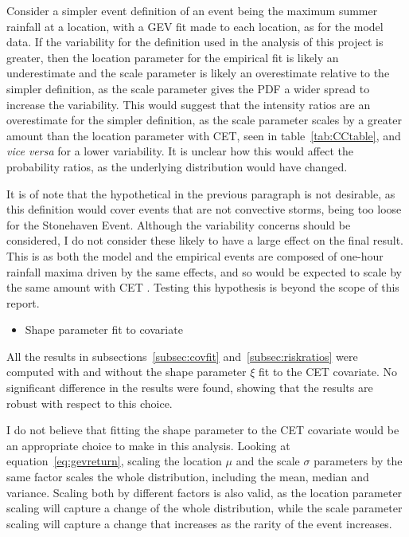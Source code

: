 Consider a simpler event definition of an event being the maximum summer rainfall at a location,
    with a GEV fit made to each location, as for the model data.
If the variability for the definition used in the analysis of this project is greater,
    then the location parameter for the empirical fit is likely an underestimate and the scale parameter is likely
    an overestimate relative to the simpler definition,
    as the scale parameter gives the PDF a wider spread to increase the variability.
This would suggest that the intensity ratios are an overestimate for the simpler definition,
    as the scale parameter scales by a greater amount than the location parameter with CET,
    seen in table~\ref{tab:CCtable},
    and \textit{vice versa} for a lower variability.
It is unclear how this would affect the probability ratios,
    as the underlying distribution would have changed.

It is of note that the hypothetical in the previous paragraph is not desirable,
    as this definition would cover events that are not convective storms,
    being too loose for the Stonehaven Event.
Although the variability concerns should be considered,
    I do not consider these likely to have a large effect on the final result.
This is as both the model and the empirical events are composed of one-hour rainfall maxima driven by the same effects,
    and so would be expected to scale by the same amount with CET .
Testing this hypothesis is beyond the scope of this report.

\begin{itemize}\item Shape parameter fit to covariate\end{itemize}

All the results in subsections~\ref{subsec:covfit} and~\ref{subsec:riskratios} were computed with and without
    the shape parameter $\xi$ fit to the CET covariate.
No significant difference in the results were found,
    showing that the results are robust with respect to this choice.

I do not believe that fitting the shape parameter to the CET covariate would be an appropriate choice to make in this analysis.
Looking at equation~\ref{eq:gevreturn},
    scaling the location $\mu$ and the scale $\sigma$ parameters by the same factor scales the whole distribution,
    including the mean, median and variance.
Scaling both by different factors is also valid,
    as the location parameter scaling will capture a change of the whole distribution,
    while the scale parameter scaling will capture a change that increases as the rarity of the event increases.

